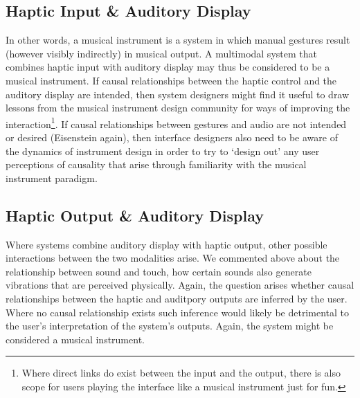 \documentclass[runningheads]{llncs}
\begin{document}
\subsection{Haptic Input \& Auditory Display}
In other words, a musical instrument is a system in which manual gestures result (however visibly indirectly) in musical output. A multimodal system that combines haptic input with auditory display may thus be considered to be a musical instrument. If causal relationships between the haptic control and the auditory display are intended, then system designers might find it useful to draw lessons from the musical instrument design community for ways of improving the interaction\footnote{Where direct links do exist between the input and the output, there is also scope for users playing the interface like a musical instrument just for fun.}. If causal relationships between gestures and audio are not intended or desired (Eisenstein again), then interface designers also need to be aware of the dynamics of instrument design in order to try to `design out' any user perceptions of causality that arise through familiarity with the musical instrument paradigm. 
\subsection{Haptic Output \& Auditory Display}
Where systems combine auditory display with haptic output, other possible interactions between the two modalities arise. We commented above about the relationship between sound and touch, how certain sounds also generate vibrations that are perceived physically. Again, the question arises whether causal relationships between the haptic and auditpory outputs are inferred by the user.  Where no causal relationship exists such inference would likely be detrimental to the user's interpretation of the system's outputs. Again, the system might be considered a musical instrument. 
\end{document}

